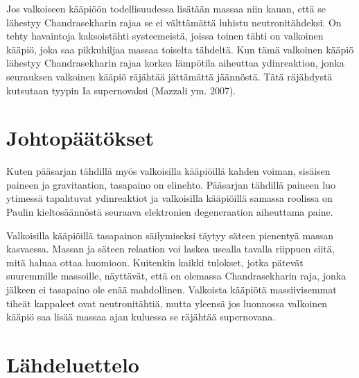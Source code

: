 \documentclass[12pt,a4paper,titlepage]{article}
\begin{document}
Jos valkoiseen kääpiöön todellisuudessa lisätään massaa niin kauan, että se lähestyy Chandrasekharin rajaa se ei välttämättä luhistu neutronitähdeksi. On tehty havaintoja kaksoistähti systeemeistä, joissa toinen tähti on valkoinen kääpiö, joka saa pikkuhiljaa massaa toiselta tähdeltä. Kun tämä valkoinen kääpiö lähestyy Chandrasekharin rajaa korkea lämpötila aiheuttaa ydinreaktion, jonka seurauksen valkoinen kääpiö räjähtää jättämättä jäännöstä. Tätä räjähdystä kutsutaan tyypin Ia supernovaksi (Mazzali ym. 2007). 

\newpage
\section{Johtopäätökset}

Kuten pääsarjan tähdillä myös valkoisilla kääpiöillä kahden voiman, sisäisen paineen ja gravitaation, tasapaino on elinehto. Pääsarjan tähdillä paineen luo ytimessä tapahtuvat ydinreaktiot ja valkoisilla kääpiöillä samassa roolissa on Paulin kieltosäännöstä seuraava elektronien degeneraation aiheuttama paine.

Valkoisilla kääpiöillä tasapainon säilymiseksi täytyy säteen pienentyä massan kasvaessa. Massan ja säteen relaation voi laskea usealla tavalla riippuen siitä, mitä haluaa ottaa huomioon. Kuitenkin kaikki tulokset, jotka pätevät suuremmille massoille, näyttävät, että on olemassa Chandrasekharin raja, jonka jälkeen ei tasapaino ole enää mahdollinen. Valkoista kääpiötä massiivisemmat tiheät kappaleet ovat neutronitähtiä, mutta yleensä jos luonnossa valkoinen kääpiö saa lisää massaa ajan kuluessa se räjähtää supernovana.


\newpage
\section{Lähdeluettelo}

 




\appendix
\end{document}
